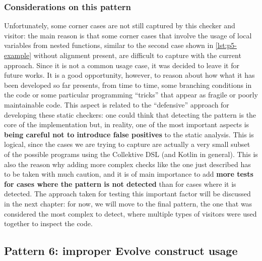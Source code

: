 \documentclass[12pt,a4paper,openright,twoside]{book}
\begin{document}
\subsubsection{Considerations on this pattern}

Unfortunately, some corner cases are not still captured by this checker and
visitor: the main reason is that some corner cases that involve the usage of
local variables from nested functions, similar to the second case shown in
\cref{lst:p5-example} without alignment present, are difficult to capture with
the current approach. Since it is not a common usage case, it was decided to
leave it for future works. It is a good opportunity, however, to reason about
how what it has been developed so far presents, from time to time, some
branching conditions in the code or some particular programming ``tricks'' that
appear as fragile or poorly maintainable code. 
%
This aspect is related to the ``defensive'' approach for developing these static
checkers: one could think that detecting the pattern is the core of the
implementation but, in reality, one of the most important aspects is
\textbf{being careful not to introduce false
positives}\cite{DBLP:journals/jss/LenarduzziPSLP23} to the static analysis.
%
This is logical, since the cases we are trying to capture are actually a very
small subset of the possible programs using the Collektive DSL (and Kotlin in
general). This is also the reason why adding more complex checks like the one
just described has to be taken with much caution, and it is of main importance
to add \textbf{more tests for cases where the pattern is not detected} than for
cases where it is detected.
%
The approach taken for testing this important factor will be discussed in the
next chapter: for now, we will move to the final pattern, the one that was
considered the most complex to detect, where multiple types of visitors were
used together to inspect the code.


 
\subsection{Pattern 6: improper Evolve construct usage}
\end{document}
